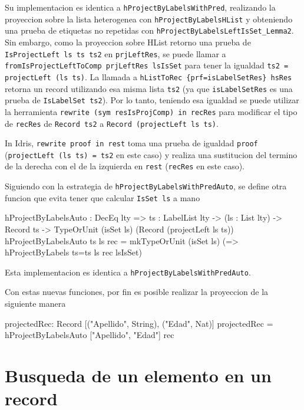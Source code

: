 Su implementacion es identica a \texttt{hProjectByLabelsWithPred}, realizando la proyeccion sobre la lista heterogenea con \texttt{hProjectByLabelsHList} y obteniendo una prueba de etiquetas no repetidas con \texttt{hProjectByLabelsLeftIsSet\_Lemma2}. Sin embargo, como la proyeccion sobre HList retorno una prueba de \texttt{IsProjectLeft ls ts ts2} en \texttt{prjLeftRes}, se puede llamar a \texttt{fromIsProjectLeftToComp prjLeftRes lsIsSet} para tener la igualdad \texttt{ts2 = projectLeft (ls ts)}. La llamada a \texttt{hListToRec \{prf=isLabelSetRes\} hsRes} retorna un record utilizando esa misma lista \texttt{ts2} (ya que \texttt{isLabelSetRes} es una prueba de \texttt{IsLabelSet ts2}). Por lo tanto, teniendo esa igualdad se puede utilizar la herramienta \texttt{rewrite (sym resIsProjComp) in recRes} para modificar el tipo de \texttt{recRes} de \texttt{Record ts2} a \texttt{Record (projectLeft ls ts)}.

In Idris, \texttt{rewrite proof in rest} toma una prueba de igualdad \texttt{proof} (\texttt{projectLeft (ls ts) = ts2} en este caso) y realiza una sustitucion del termino de la derecha con el de la izquierda en \texttt{rest} (\texttt{recRes} en este caso).

Siguiendo con la estrategia de \texttt{hProjectByLabelsWithPredAuto}, se define otra funcion que evita tener que calcular \texttt{IsSet ls} a mano

\begin{code}
hProjectByLabelsAuto : DecEq lty => 
  {ts : LabelList lty} -> (ls : List lty) -> 
  Record ts -> TypeOrUnit (isSet ls) 
  (Record (projectLeft ls ts))
hProjectByLabelsAuto {ts} ls rec = 
  mkTypeOrUnit (isSet ls) 
  (\lsIsSet => hProjectByLabels {ts=ts} ls rec lsIsSet)
\end{code}

Esta implementacion es identica a \texttt{hProjectByLabelsWithPredAuto}.

Con estas nuevas funciones, por fin es posible realizar la proyeccion de la siguiente manera

\begin{code}
projectedRec: Record [("Apellido", String), 
  ("Edad", Nat)]
projectedRec = hProjectByLabelsAuto 
  ["Apellido", "Edad"] rec
\end{code}

\section{Busqueda de un elemento en un record}

